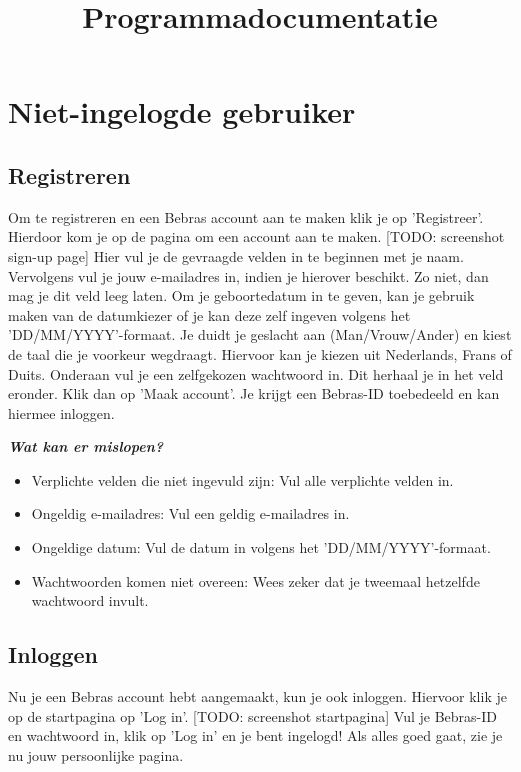\documentclass[]{article}
\title{
    Programmadocumentatie
}
\begin{document}
\maketitle

\section{Niet-ingelogde gebruiker}

\subsection{Registreren}
Om te registreren en een Bebras account aan te maken klik je op 'Registreer'. Hierdoor kom je op de pagina om een account aan te maken. [TODO: screenshot sign-up page] Hier vul je de gevraagde velden in te beginnen met je naam. Vervolgens vul je jouw e-mailadres in, indien je hierover beschikt. Zo niet, dan mag je dit veld leeg laten. Om je geboortedatum in te geven, kan je gebruik maken van de datumkiezer of je kan deze zelf ingeven volgens het 'DD/MM/YYYY'-formaat. Je duidt je geslacht aan (Man/Vrouw/Ander) en kiest de taal die je voorkeur wegdraagt. Hiervoor kan je kiezen uit Nederlands, Frans of Duits. Onderaan vul je een zelfgekozen wachtwoord in. Dit herhaal je in het veld eronder. Klik dan op 'Maak account'. Je krijgt een Bebras-ID toebedeeld en kan hiermee inloggen.

\textbf{\textit{Wat kan er mislopen?}}

\begin{itemize}
\item Verplichte velden die niet ingevuld zijn: Vul alle verplichte velden in.
\item Ongeldig e-mailadres: Vul een geldig e-mailadres in.
\item Ongeldige datum: Vul de datum in volgens het 'DD/MM/YYYY'-formaat.
\item Wachtwoorden komen niet overeen: Wees zeker dat je tweemaal hetzelfde wachtwoord invult.
\end{itemize}

\subsection{Inloggen}
Nu je een Bebras account hebt aangemaakt, kun je ook inloggen. Hiervoor klik je op de startpagina op 'Log in'. [TODO: screenshot startpagina] Vul je Bebras-ID en wachtwoord in, klik op 'Log in' en je bent ingelogd! Als alles goed gaat, zie je nu jouw persoonlijke pagina. 
\end{document}
